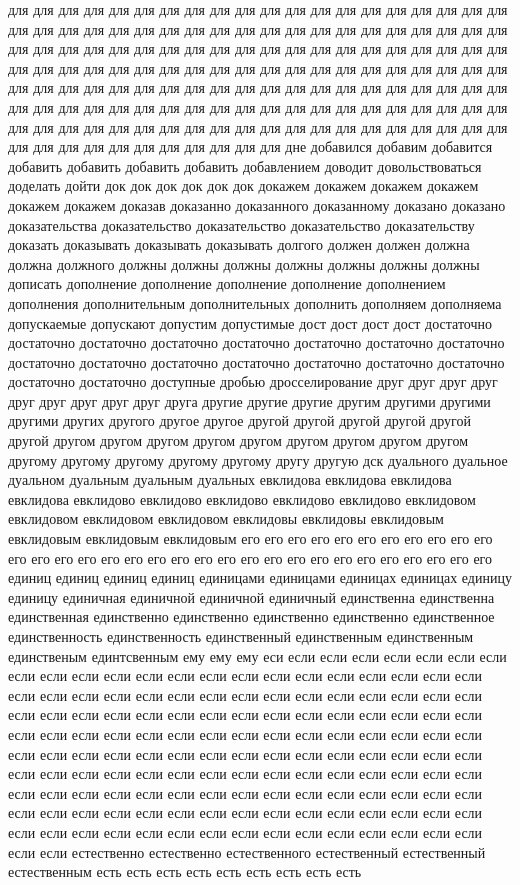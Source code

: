 для для для для для для для для для для для для для для для для для для для для для для для для для для для для для для для для для для для для для для для для для для для для для для для для для для для для для для для для для для для для для для для для для для для для для для для для для для для для для для для для для для для для для для для для для для для для для для для для для для для для для для для для для для для для для для для для для для для для для для для для для для для для для для для для для для для для для для для для для для для для для для для для для для для для для для для дне добавился добавим добавится добавить добавить добавить добавить добавлением доводит довольствоваться доделать дойти док док док док док док докажем докажем докажем докажем докажем докажем доказав доказанно доказанного доказанному доказано доказано доказательства доказательство доказательство доказательство доказательству доказать доказывать доказывать доказывать долгого должен должен должна должна должного должны должны должны должны должны должны должны дописать дополнение дополнение дополнение дополнение дополнением дополнения дополнительным дополнительных дополнить дополняем дополняема допускаемые допускают допустим допустимые дост дост дост дост достаточно достаточно достаточно достаточно достаточно достаточно достаточно достаточно достаточно достаточно достаточно достаточно достаточно достаточно достаточно достаточно достаточно доступные дробью дросселирование друг друг друг друг друг друг друг друг друг друга другие другие другие другим другими другими другими других другого другое другое другой другой другой другой другой другой другом другом другом другом другом другом другом другом другом другому другому другому другому другому другу другую дск дуального дуальное дуальном дуальным дуальным дуальных евклидова евклидова евклидова евклидова евклидово евклидово евклидово евклидово евклидово евклидовом евклидовом евклидовом евклидовом евклидовы евклидовы евклидовым евклидовым евклидовым евклидовым его его его его его его его его его его его его его его его его его его его его его его его его его его его его его его его его единиц единиц единиц единиц единицами единицами единицах единицах единицу единицу единичная единичной единичной единичный единственна единственна единственная единственно единственно единственно единственно единственное единственность единственность единственный единственным единственным единственым единтсвенным ему ему ему еси если если если если если если если если если если если если если если если если если если если если если если если если если если если если если если если если если если если если если если если если если если если если если если если если если если если если если если если если если если если если если если если если если если если если если если если если если если если если если если если если если если если если если если если если если если если если если если если если если если если если если если если если если если если если если если если если если если если если если если если если если если если если если если если если если если если если если если если если если если если если если если если если естественно естественно естественного естественный естественный естественным есть есть есть есть есть есть есть есть есть 